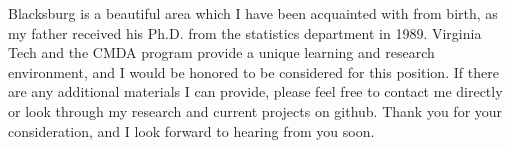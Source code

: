 \documentclass[11pt,letterpaper,sans,unicode]{moderncv}        %
\begin{document}




Blacksburg is a beautiful area which I have been acquainted with from birth, as my father received his Ph.D. from the statistics department in 1989. Virginia Tech and the CMDA program provide a unique learning and research environment, and I would be honored to be considered for this position. If there are any additional materials I can provide, please feel free to contact me directly or look through my research and current projects on github. Thank you for your consideration, and I look forward to hearing from you soon.  

\vspace{1cm}
\makeletterclosing

\end{document}
